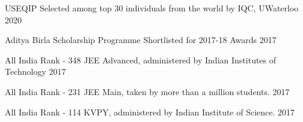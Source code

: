 
\begin{cvhonors}

  \cvhonor
    {USEQIP} %
    {Selected among top 30 individuals from the world by IQC, UWaterloo} %
    {} %
    {2020} %

  \cvhonor
    {Aditya Birla Scholarship Programme} %
    {Shortlisted for 2017-18 Awards} %
    {} %
    {2017} %

  \cvhonor
    {All India Rank - 348} %
    {JEE Advanced, administered by Indian Institutes of Technology} %
    {} %
    {2017} %
    
  \cvhonor
    {All India Rank - 231} %
    {JEE Main, taken by more than a million students.} %
    {} %
    {2017} %

  \cvhonor
    {All India Rank - 114} %
    {KVPY, administered by Indian Institute of Science.} %
    {} %
    {2017} %

\end{cvhonors}